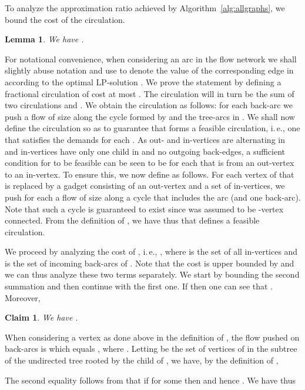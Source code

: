 \documentclass[letterpaper,11pt]{article}
\newtheorem{lemma}[theorem]{Lemma}
\newtheorem{claim}[theorem]{Claim}
\newenvironment{proofclaim}{\begin{trivlist}
\item[\hskip\labelsep {\it Proof of Claim}.]}{\QED \end{trivlist}}
\newenvironment{proof}{\begin{trivlist}
\item[\hskip\labelsep {\bf Proof}.]}{\QED \end{trivlist}}
\newcommand{\QED}{\hfill }
\begin{document}
To analyze the approximation ratio achieved by
Algorithm~\ref{alg:allgraphs}, we bound the cost of the circulation.
\begin{lemma}
\label{lemma:circcost}
  We have .
\end{lemma}
\begin{proof}
  For notational convenience, when considering an arc  in the flow
  network we shall slightly abuse notation and use  to denote
  the value of the corresponding edge in  according to the optimal
  LP-solution .
  We prove the statement by defining a fractional circulation  of
  cost at most . The
  circulation  will in turn be the sum of two circulations  and
  . We obtain the circulation  as follows: for each back-arc
   we push a flow of size  along the cycle formed by
   and the tree-arcs in .  We shall now define the circulation
   so as to guarantee that  forms a feasible circulation,
  i.\,e., one that satisfies the demands  for each . As out- and in-vertices are alternating in  and
  in-vertices have only one child in  and no outgoing
  back-edges, a sufficient condition for  to be feasible can be
  seen to be  for each  that is from an
  out-vertex to an in-vertex. To ensure this, we now define  as
  follows. For each vertex  of  that is replaced by a gadget
  consisting of an out-vertex  and a set  of
  in-vertices, we push for each  a flow of size
   along a cycle that includes the arc 
  (and one back-arc).
  Note that such a cycle is guaranteed to exist since  was assumed to be
  -vertex connected.
  From the definition of , we have thus
  that  defines a feasible circulation.

  We proceed by analyzing the cost of , i.\,e., , where  is the set
  of all in-vertices and  is the set of incoming back-arcs of
  . Note that the cost is upper bounded by
   and we can thus analyze these two terms
  separately. We start by bounding the second summation and then
  continue with the first one. If  then one can see that . Moreover,
  \begin{claim}
    \label{claim:firstcost}
    We have .
  \end{claim}
  \begin{proofclaim}
    When considering a vertex  as done above in the definition of
    , the flow pushed on back-arcs is  which equals , where . Letting  be the set of vertices of  in the
    subtree of the undirected tree  rooted by the child of  ,
    we have, by the definition of ,

The second equality follows from that if  for some  then  and hence . We have thus 


\end{proofclaim}
\end{proof}
\end{document}
